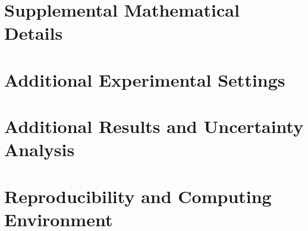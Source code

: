 \documentclass{article}
\begin{document}
\section{Supplemental Mathematical Details}
\section{Additional Experimental Settings}
\section{Additional Results and Uncertainty Analysis}
\section{Reproducibility and Computing Environment}
\end{document}

